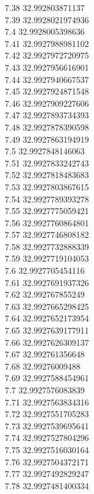 {7.38	32.992803871137\\
7.39	32.9928021974936\\
7.4	32.9928005398636\\
7.41	32.9927988981102\\
7.42	32.9927972720975\\
7.43	32.9927956616901\\
7.44	32.9927940667537\\
7.45	32.9927924871548\\
7.46	32.9927909227606\\
7.47	32.9927893734393\\
7.48	32.9927878390598\\
7.49	32.9927863194919\\
7.5	32.9927848146063\\
7.51	32.9927833242743\\
7.52	32.9927818483683\\
7.53	32.9927803867615\\
7.54	32.9927789393278\\
7.55	32.9927775059421\\
7.56	32.9927760864801\\
7.57	32.9927746808182\\
7.58	32.9927732888339\\
7.59	32.9927719104053\\
7.6	32.9927705454116\\
7.61	32.9927691937326\\
7.62	32.992767855249\\
7.63	32.9927665298425\\
7.64	32.9927652173954\\
7.65	32.9927639177911\\
7.66	32.9927626309137\\
7.67	32.992761356648\\
7.68	32.99276009488\\
7.69	32.9927588454961\\
7.7	32.9927576083839\\
7.71	32.9927563834316\\
7.72	32.9927551705283\\
7.73	32.9927539695641\\
7.74	32.9927527804296\\
7.75	32.9927516030164\\
7.76	32.9927504372171\\
7.77	32.9927492829247\\
7.78	32.9927481400334\\
}
